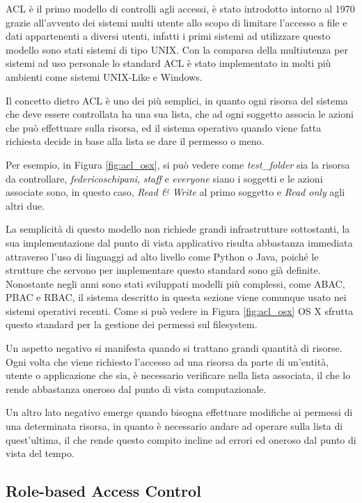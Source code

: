 \ac{ACL} è il primo modello di controlli agli accessi, è stato introdotto intorno al 1970 grazie all'avvento dei sistemi multi utente allo scopo di limitare l'accesso a file e dati appartenenti a diversi utenti, infatti i primi sistemi ad utilizzare questo modello sono stati sistemi di tipo UNIX. Con la comparsa della multiutenza per sistemi ad uso personale lo standard \ac{ACL} è stato implementato in molti più ambienti come sistemi UNIX-Like e Windows. \par
Il concetto dietro \ac{ACL} è uno dei più semplici, in quanto ogni risorsa del sistema che deve essere controllata ha una sua lista, che ad ogni soggetto associa le azioni che può effettuare sulla risorsa, ed il sistema operativo quando viene fatta richiesta decide in base alla lista se dare il permesso o meno. 


Per esempio, in Figura \ref{fig:acl_osx}, si può vedere come \textit{test\_folder} sia la risorsa da controllare, \textit{federicoschipani}, \textit{staff} e \textit{everyone} siano i soggetti e le azioni associate sono, in questo caso, \textit{Read \& Write} al primo soggetto e \textit{Read only} agli altri due.


La semplicità di questo modello non richiede grandi infrastrutture sottostanti, la  sua implementazione dal punto di vista applicativo risulta abbastanza immediata attraverso l'uso di linguaggi ad alto livello come Python o Java, poiché le strutture che servono per implementare questo standard sono già definite.
Nonostante negli anni sono stati sviluppati modelli più complessi, come \ac{ABAC}, \ac{PBAC} e \ac{RBAC}, il sistema descritto in questa sezione viene comunque usato nei sistemi operativi recenti. Come si può vedere in Figura \ref{fig:acl_osx} OS X sfrutta questo standard per la gestione dei permessi sul filesystem. \par
Un aspetto negativo si manifesta quando si trattano grandi quantità di risorse. Ogni volta che viene richiesto l'accesso ad una risorsa da parte di un'entità, utente o applicazione che sia, è necessario verificare nella lista associata, il che lo rende abbastanza oneroso dal punto di vista computazionale. \par
Un altro lato negativo emerge quando bisogna effettuare modifiche ai permessi di una determinata risorsa, in quanto è necessario andare ad operare sulla lista di quest'ultima, il che rende questo compito incline ad errori ed oneroso dal punto di vista del tempo.


\subsection*{Role-based Access Control} %
\label{sub:role_based_access_control}

